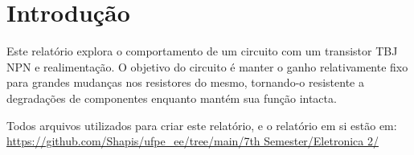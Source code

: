 \section{Introdução}

Este relatório explora o comportamento de um circuito com um transistor TBJ NPN e realimentação. O objetivo do circuito é manter o ganho relativamente fixo para grandes mudanças nos resistores do mesmo, tornando-o resistente a degradações de componentes enquanto mantém sua função intacta.

Todos arquivos utilizados para criar este relatório, e o relatório em si estão em:  \url{https://github.com/Shapis/ufpe_ee/tree/main/7th Semester/Eletronica 2/}

